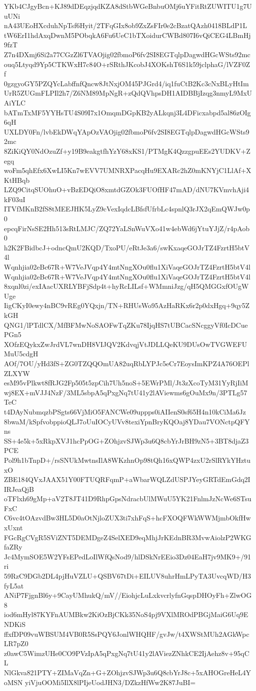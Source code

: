YKb4CJgyBcn+KJ89dDEqzjqdKZA8dStbWGeBnbuOMj6uYFitRtZUWITU1g7UuUNi
nA43UEoHXcduhNpTsf6Hyit/2TFqGIx8ob9ZxZsFIr0e2cBzatQAzh0418BLdP1L
tW6ErI1hdAxqDwnM5PObqkA6Fu6UeC1bTXoidurCWBd807I6vQiCEG4LBmHj9fzT
Z7n4DXmj6Si2a77CGzZl6TVAOjig02fbmoP6fv2SI8EGTqlpDagwdHGcWSts92mc
ouq5Ltyqd9Yp5CTKWxH7c84O+rSRthJKcobJ4XOKshT6S1k59jclphaG/lVZF0Zf
0gzgyoGY5PZQYcLabffnfQncw8JtNxjOM45PJGrd4/iq1fuCtB2Kc3cNxBLyHtIm
UrR5ZUGmFLPIl2h7/Z6NM89MpNgR+zQdQVhpsDH1AIDBBjIzqg3nmyL9MxUAiYLC
bATmTxMF5YYHsTU4S09I7x1OmqmDGpKB2yALkqnj3L4DFicxabpd5al86zOIg6qH
UXLDY0Fn/lvbEkDWqYApOzVAOjig02fbmoP6fv2SI8EGTqlpDagwdHGcWSts92mc
8ZiKiQY0NdOzuZf+y19B9eakgtfhYzY68xKS1/PTMgK4QzzgpuEEs2YUDKV+Zegq
woFm5qhEfx6XwLI5Kn7wEVV7UMNRXPacqHu9EXARc2hZ0mKNYjC1LlAf+XKtHBqb
LZQ9CitqSUOhuO+vBzEDQiO8xmtdGZOk3FUOfHF47mAD/dNU7KVmvhAji4kF03uI
ITVfMKnB2fS8tMEEJHK5LyZ9cVexIqdcLBfsfUfrbLc4spnlQ3rJX2qEmQWJw0p0
epcqFirNsSE2Hh513sRtLMJC/ZQ72YaLSnWuVXo41w4ebWd6jYtuYJjZ/r4pAob0
h2K2FBidbcJ+odncQmU2KQD/TxoPU/eRtJe3a6/swKxaqeGOJrTZ4FzrtH5btV4l
Wqnhjia02eBc67R+W7VeJVqp4Y4mtNngXOu0flu1XiVaqeGOJrTZ4FzrtH5btV4l
Wqnhjia02eBc67R+W7VeJVqp4Y4mtNngXOu0flu1XiVaqeGOJrTZ4FzrtH5btV4l
8xqnl0zi/exIAacUXRLYBFjSdp4t+hyRcLILsf+WMmniJzg/qH5QMGGxfOUgWUge
IigCKyI0ewy4nBC9vREg0YQxjn/TN+RHUsWo95AzHaRKx6r2p0dxHgq+9qy5ZkGH
QNG1/lPTdlCX/MfBFMwNoSAOFwTqZKu78IjqHS7tUBCacSNcggyVf0IcDCuePGn5
XOfzEQykxZwJrdVL7wnDH8VIJQV2KdvqjVtJDLLQeKU9DUsOwTVGWEFUMuU5cdgH
AOf/7OU/yHd3fS+ZG0TZQQOmUA82uqRbLYPJc5eCr7EoysImKPZ4A76OEPlZLXYW
esM95vPlkwt8fRJG2Fp505t5zpCih7Uh5noS+5EWrPMl/Jt3zXcoTyM31YyRjIiM
wj8EX+mVJJ4NzF/3ML5sbpA5qPxgNq7tU41y2lAViewms6gOuMx9n/3PTLg57TeC
t4DAyNubmqzbPSgts66VjMiO5FANCWe09uppps0iAIIenS0sf65H4n10kCiMa6Jz
8bwaM/kSpfvobppioQLJ7oUuIOCyUVv8texiYpnBryKQOaj8YDau7VONctpQFYns
SS+4e5k+5xRkpXVJ1hcPpOG+ZOhjzvSJWp3u6Q8cbYrJrBH9zN5+3BT8djaZ3PCE
Pol9h1bTnpD+/rsSNUkMwtnsIlA8WKzhnOp98tQh16xQWP4zxU2rSlRYkYHztuxO
ZBE184QVxJAAX51Y00FTUQRFqmP+aWbarWQLZdUSPJYeyGRTdEmGdq2IIRJeaQjB
oTFlxh69gMp+aV2T8JT41D9RhpGpsNdracbUlMWuU5YK21FnlmJzNcWe6STsuFxC
C6vc4tOAzvdBw3HL5D0aOtNjloZUX3ti7xhFqS+hcFXOQFWkWWMjmbOkfHwxUxnt
FGcRgCVgR5SViZNT5DEMDgeZ4SelXED9eqMhjJrKEdnBR3MvwAiolzP2WKGfaZRy
Jc4MymSOE5W2YFsEPedLoIlWfQsNod9/hlDSkNrEEio3Dz04EaH7jv9MK9+/91ri
59RzC9DGb2DL4pjHuVZLU+QSBV67tDi+EILUV8uhrHmLPyTA3UvcqWD/H3fyL5at
ANiP7FjgnBl6y+9CayUMhukQ/mV//EiohjcLuLxkvcrlyfnGqspDHOyFh+ZlwOG8
iod6mHyl87KYFnAUMBkw2KiOzBjCKk35NoS4pj9VXlMROdPBGjMaiG6Uq9ENDKiS
ffxfDP09vuWBSUM4VB0R5SsPQY6JonlWHQHF/gvJw/t4XWStMUh2AGkWpcLR7pZ0
z0awC5WimzUHe0CO9PVzIpA5qPxgNq7tU41y2lAViezZNhkCE2IjAehz8v+95qCL
NlGkva821PTY+ZIMaVqZn+G+ZOhjzvSJWp3u6Q8cbYrJ8c+5xAHOGreHeL4YoMSN
yiVjuOOMi5IlX8lPIjeUodJHN3/DZkzHfWw2K87JuBI=
